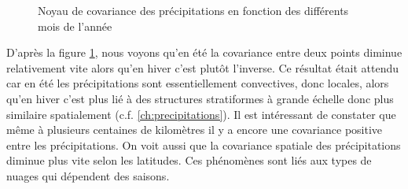 \documentclass[a4paper,11pt]{article}
\numberwithin{equation}{section}
\begin{document}
\begin{figure}[H]
\begin{tabular}{ccc}
\end{tabular}
	\caption{Noyau de covariance des précipitations en fonction des différents mois de l'année}
	\label{fig-kernel-precip}
\end{figure}

D'après la figure \ref{fig-kernel-precip}, nous voyons qu'en été la covariance entre deux points diminue relativement vite alors qu'en hiver c'est plutôt l'inverse. Ce résultat était attendu car en été les précipitations sont essentiellement convectives, donc locales, alors qu'en hiver c'est plus lié à des structures stratiformes à grande échelle donc plus similaire spatialement (c.f. \ref{ch:precipitations}).
Il est intéressant de constater que même à plusieurs centaines de kilomètres il y a encore une covariance positive entre les précipitations. On voit aussi que la covariance spatiale des précipitations diminue plus vite selon les latitudes. Ces phénomènes sont liés aux types de nuages qui dépendent des saisons.
\end{document}
